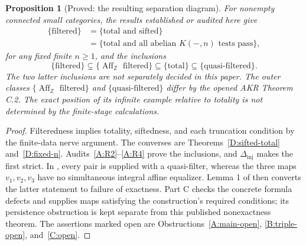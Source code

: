 \documentclass[11pt,a4paper]{article}
\newcommand{\Z}{\mathbb Z}
\newcommand{\Aff}{\operatorname{Aff}}
\newcommand{\Dinj}{\Delta_{\mathrm{inj}}}
\newtheorem{proposition}[theorem]{Proposition}
\theoremstyle{definition}
\begin{document}
\begin{proposition}[Proved: the resulting separation diagram]\label{F:classes}
For nonempty connected small categories, the results established or audited here give
\begin{align*}
\{\text{filtered}\}
 &=\{\text{total and sifted}\}\\
 &=\{\text{total and all abelian }K(-,n)\text{ tests pass}\},
\end{align*}
for any fixed finite $n\geq1$, and the inclusions
\[
 \{\text{filtered}\}\subsetneq
 \{\Aff_\Z\text{ filtered}\}\subseteq
 \{\text{total}\}\subseteq
 \{\text{quasi-filtered}\}.
\]
The two latter inclusions are not separately decided in this paper. The outer classes $\{\Aff_\Z\text{ filtered}\}$ and $\{\text{quasi-filtered}\}$ differ by the opened AKR Theorem C.2. The exact position of its infinite example relative to totality is not determined by the finite-stage calculations.
\end{proposition}
\begin{proof}
Filteredness implies totality, siftedness, and each truncation condition by the finite-data nerve argument. The converses are Theorems~\ref{D:sifted-total} and~\ref{D:fixed-n}. Audits~\ref{A:R2}--\ref{A:R4} prove the inclusions, and $\Dinj$ makes the first strict. In \citet[Construction C.1 and Theorem C.2]{AdamekKoubekReiterman1981}, every pair is supplied with a quasi-filter, whereas the three maps $v_1,v_2,v_3$ have no simultaneous integral affine equalizer. Lemma 1 of \citet{IsbellMitchell1973} then converts the latter statement to failure of exactness. Part C checks the concrete formula defects and supplies maps satisfying the construction's required conditions; its persistence obstruction is kept separate from this published nonexactness theorem. The assertions marked open are Obstructions~\ref{A:main-open}, \ref{B:triple-open}, and~\ref{C:open}.
\end{proof}
\end{document}
